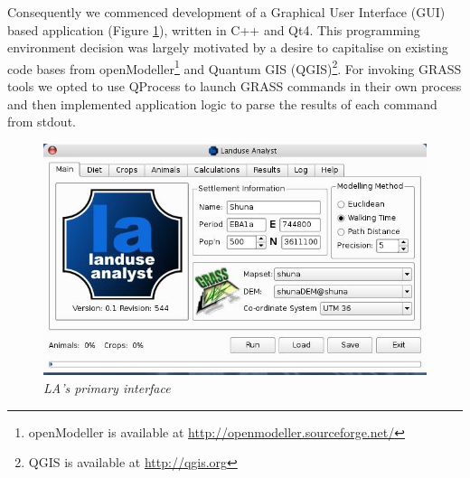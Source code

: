   Consequently we commenced development of a Graphical User Interface (GUI)
  based application (Figure \ref{fig:la544}), written in C++ and Qt4. This
  programming environment decision was largely motivated by a desire to
  capitalise on existing code bases from openModeller\footnote{openModeller is
  available at \url{http://openmodeller.sourceforge.net/}} and Quantum GIS
  (QGIS)\footnote{QGIS is available at \url{http://qgis.org}}.  For invoking
  GRASS tools we opted to use QProcess to launch GRASS commands in their own
  process and then implemented application logic to parse the results of each
  command from stdout.
\begin{figure}[htbp] %
  \includegraphics[scale=0.36]{./images/LanduseAnalyst544.jpg}
  \caption{\label{fig:la544}\textit{LA's primary interface}}
\end{figure}
